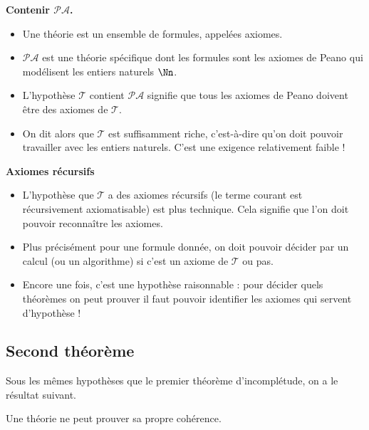 \documentclass[11pt,class=report,crop=false]{standalone}
\begin{document}
\bigskip

\textbf{Contenir $\mathcal{PA}$.}

\begin{itemize}
    \item Une théorie est un ensemble de formules, appelées axiomes.

    \item $\mathcal{PA}$ est une théorie spécifique dont les formules sont les axiomes de Peano qui modélisent les entiers naturels $\Nn$.

    \item L'hypothèse \og{}$\mathcal{T}$ contient $\mathcal{PA}$\fg{} signifie que tous les axiomes de Peano doivent être des axiomes de $\mathcal{T}$.

    \item On dit alors que $\mathcal{T}$ est \og{}suffisamment riche\fg{}, c'est-à-dire qu'on doit pouvoir travailler avec les entiers naturels. C'est une exigence relativement faible !
\end{itemize}

\bigskip

\textbf{Axiomes récursifs}

\begin{itemize}
    \item L'hypothèse que $\mathcal{T}$ a des axiomes récursifs (le terme courant est \og{}récursivement axiomatisable\fg{}) est plus technique. Cela signifie que l'on doit pouvoir reconnaître les axiomes.

    \item Plus précisément pour une formule donnée, on doit pouvoir décider par un calcul (ou un algorithme) si c'est un axiome de $\mathcal{T}$ ou pas.

    \item Encore une fois, c'est une hypothèse raisonnable : pour décider quels théorèmes on peut prouver il faut pouvoir identifier les axiomes qui servent d'hypothèse !
\end{itemize}


\subsection{Second théorème}

Sous les mêmes hypothèses que le premier théorème d'incomplétude, on a le résultat suivant.
\begin{theoreme}
Une théorie ne peut prouver sa propre cohérence.
\end{theoreme}
\end{document}
